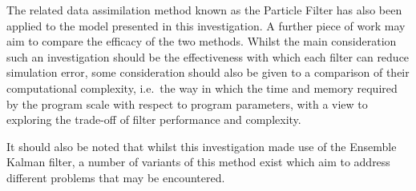 
The related data assimilation method known as the Particle Filter has also been
applied to the model presented in this investigation.
A further piece of work may aim to compare the efficacy of the two methods.
Whilst the main consideration such an investigation should be the effectiveness
with which each filter can reduce simulation error, some consideration should
also be given to a comparison of their computational complexity, i.e.\ the way
in which the time and memory required by the program scale with respect to
program parameters, with a view to exploring the trade-off of filter performance
and complexity.

It should also be noted that whilst this investigation made use of the Ensemble
Kalman filter, a number of variants of this method exist
\citep{keller2018comparing, katzfuss2016understanding} which aim to address
different problems that may be encountered.

